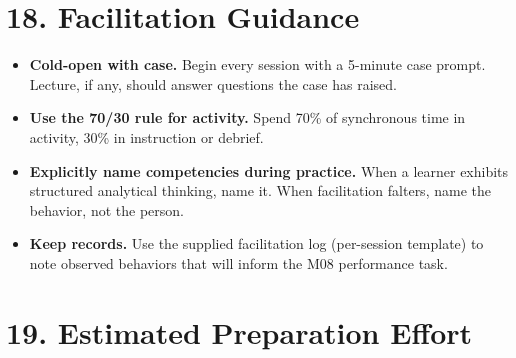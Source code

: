 \documentclass[11pt,letterpaper,oneside]{report}
\begin{document}
\section*{18. Facilitation Guidance}
\begin{itemize}
  \item \textbf{Cold-open with case.} Begin every session with a 5-minute case prompt. Lecture, if any, should answer questions the case has raised.
  \item \textbf{Use the 70/30 rule for activity.} Spend 70\% of synchronous time in activity, 30\% in instruction or debrief.
  \item \textbf{Explicitly name competencies during practice.} When a learner exhibits structured analytical thinking, name it. When facilitation falters, name the behavior, not the person.
  \item \textbf{Keep records.} Use the supplied facilitation log (per-session template) to note observed behaviors that will inform the M08 performance task.
\end{itemize}

\section*{19. Estimated Preparation Effort}
\end{document}
